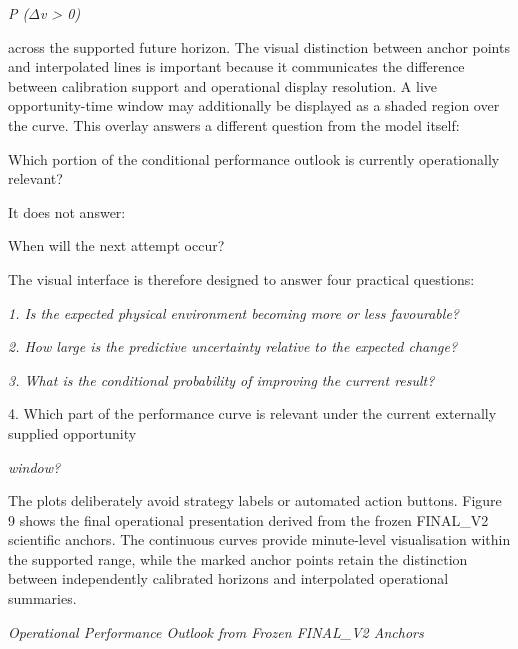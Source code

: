 \begin{center}\textit{P (\ensuremath{\Delta}v > 0)}\end{center}

across the supported future horizon. The visual distinction between anchor points and interpolated lines is important because it communicates the difference between calibration support and operational display resolution. A live opportunity-time window may additionally be displayed as a shaded region over the curve. This overlay answers a different question from the model itself:

Which portion of the conditional performance outlook is currently operationally relevant?

It does not answer:

When will the next attempt occur?

The visual interface is therefore designed to answer four practical questions:

\begin{center}\textit{1. Is the expected physical environment becoming more or less favourable?}\end{center}

\begin{center}\textit{2. How large is the predictive uncertainty relative to the expected change?}\end{center}

\begin{center}\textit{3. What is the conditional probability of improving the current result?}\end{center}

4. Which part of the performance curve is relevant under the current externally supplied opportunity

\begin{center}\textit{window?}\end{center}

The plots deliberately avoid strategy labels or automated action buttons. Figure 9 shows the final operational presentation derived from the frozen FINAL\_V2 scientific anchors. The continuous curves provide minute-level visualisation within the supported range, while the marked anchor points retain the distinction between independently calibrated horizons and interpolated operational summaries.

\begin{center}\textit{Operational Performance Outlook from Frozen FINAL\_V2 Anchors}\end{center}

